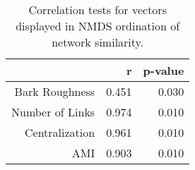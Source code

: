 \begin{table}[ht]
\centering
\begin{tabular}{rrr}
  \hline
 & r & p-value \\ 
  \hline
Bark Roughness & 0.451 & 0.030 \\ 
  Number of Links & 0.974 & 0.010 \\ 
  Centralization & 0.961 & 0.010 \\ 
  AMI & 0.903 & 0.010 \\ 
   \hline
\end{tabular}
\caption{Correlation tests for vectors displayed in NMDS ordination of network similarity.} 
\label{tab:vec}
\end{table}
